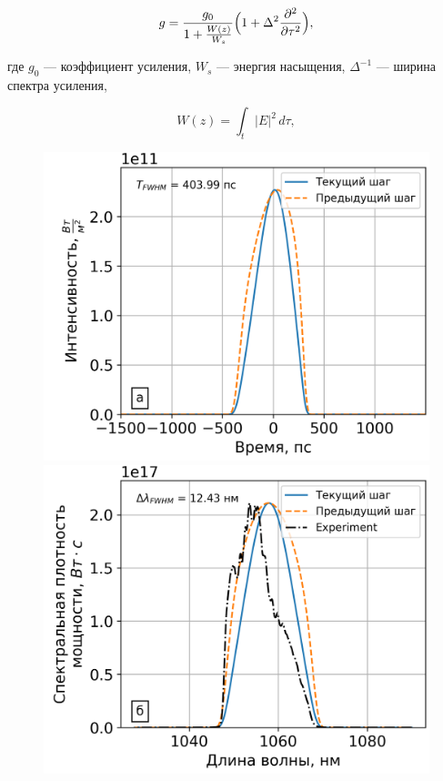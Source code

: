 \documentclass[12pt]{article}
\begin{document}
\begin{equation}
    g = \frac{g_0}{1 + \frac{W(z)}{W_s}} \Bigl( 1 + \Delta^2 \frac{\partial^2}{\partial \tau^2} \Bigr),
\end{equation}

где $g_0$ — коэффициент усиления, $W_s$ — энергия насыщения, $\Delta^{-1}$ — ширина спектра усиления,

\begin{equation}
    W(z) = \int_{t} |E|^2 \,d\tau,
\end{equation}

\begin{figure}[h!]
  \centering
  \begin{minipage}[b]{0.5\textwidth}
    \includegraphics[width=\linewidth]{Images/Gauss Pulse Parabolic Profile/Импульс и спектр/!8. Yb3+ 6_125, 0.9m_pusle}
  \end{minipage}%
  \begin{minipage}[b]{0.5\textwidth}
    \includegraphics[width=\linewidth]{Images/Gauss Pulse Parabolic Profile/Импульс и спектр/!8. Yb3+ 6_125, 0.9m_spectrum}
  \end{minipage}


\end{figure}
\end{document}
